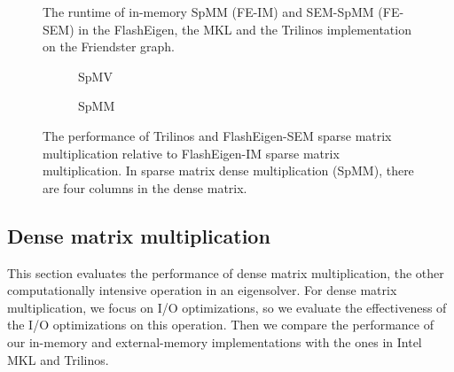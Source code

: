 \begin{figure}
	\begin{center}
		\footnotesize
		
		\caption{The runtime of in-memory SpMM (FE-IM) and SEM-SpMM (FE-SEM)
			in the FlashEigen, the MKL and the Trilinos implementation on
		the Friendster graph.}
		\label{perf:spmm}
	\end{center}
\end{figure}

\begin{figure}[t]
\centering
\footnotesize
\begin{subfigure}{.5\linewidth}
	
	\caption{SpMV}
	\label{fig:spmm1}
\end{subfigure}%
\begin{subfigure}{.5\linewidth}
	
	\caption{SpMM}
	\label{fig:spmm4}
\end{subfigure}
\caption{The performance of Trilinos and FlashEigen-SEM sparse matrix
multiplication relative to FlashEigen-IM sparse matrix multiplication.
In sparse matrix dense multiplication (SpMM), there are four columns
in the dense matrix.}
\label{fig:spmm}
\end{figure}

%		
%		

\subsection{Dense matrix multiplication}

This section evaluates the performance of dense matrix multiplication,
the other computationally intensive operation in an eigensolver.
For dense matrix multiplication, we focus on I/O optimizations, so we evaluate
the effectiveness of the I/O optimizations on this operation. Then we
compare the performance of our in-memory and external-memory
implementations with the ones in Intel MKL and Trilinos.


